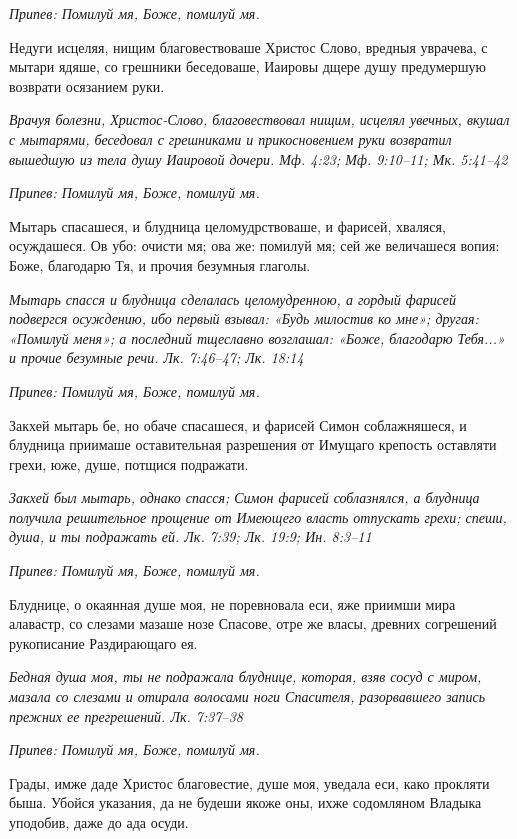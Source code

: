 \itshape Припев:\normalfont{} Помилуй мя, Боже, помилуй мя.


Недуги исцеляя, нищим благовествоваше Христос Слово, вредныя уврачева, с мытари ядяше, со грешники беседоваше, Иаировы дщере душу предумершую возврати осязанием руки.


\itshape Врачуя болезни, Христос-Слово, благовествовал нищим, исцелял увечных, вкушал с мытарями, беседовал с грешниками и прикосновением руки возвратил вышедшую из тела душу Иаировой дочери. Мф. 4:23; Мф. 9:10–11; Мк. 5:41–42\normalfont{}


\itshape Припев:\normalfont{} Помилуй мя, Боже, помилуй мя.


Мытарь спасашеся, и блудница целомудрствоваше, и фарисей, хваляся, осуждашеся. Ов убо: очисти мя; ова же: помилуй мя; сей же величашеся вопия: Боже, благодарю Тя, и прочия безумныя глаголы.


\itshape Мытарь спасся и блудница сделалась целомудренною, а гордый фарисей подвергся осуждению, ибо первый взывал: «Будь милостив ко мне»; другая: «Помилуй меня»; а последний тщеславно возглашал: «Боже, благодарю Тебя...» и прочие безумные речи. Лк. 7:46–47; Лк. 18:14\normalfont{}


\itshape Припев:\normalfont{} Помилуй мя, Боже, помилуй мя.


Закхей мытарь бе, но обаче спасашеся, и фарисей Симон соблажняшеся, и блудница приимаше оставительная разрешения от Имущаго крепость оставляти грехи, юже, душе, потщися подражати.


\itshape Закхей был мытарь, однако спасся; Симон фарисей соблазнялся, а блудница получила решительное прощение от Имеющего власть отпускать грехи; спеши, душа, и ты подражать ей. Лк. 7:39; Лк. 19:9; Ин. 8:3–11\normalfont{}


\itshape Припев:\normalfont{} Помилуй мя, Боже, помилуй мя.


Блуднице, о окаянная душе моя, не поревновала еси, яже приимши мира алавастр, со слезами мазаше нозе Спасове, отре же власы, древних согрешений рукописание Раздирающаго ея.


\itshape Бедная душа моя, ты не подражала блуднице, которая, взяв сосуд с миром, мазала со слезами и отирала волосами ноги Спасителя, разорвавшего запись прежних ее прегрешений. Лк. 7:37–38\normalfont{}


\itshape Припев:\normalfont{} Помилуй мя, Боже, помилуй мя.


Грады, имже даде Христос благовестие, душе моя, уведала еси, како прокляти быша. Убойся указания, да не будеши якоже оны, ихже содомляном Владыка уподобив, даже до ада осуди.


